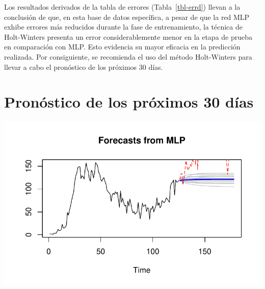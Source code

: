 \documentclass[
  letterpaper,
  DIV=11,
  numbers=noendperiod]{scrreport}
\newenvironment{Shaded}{\begin{snugshade}}{\end{snugshade}}
\newcommand{\AttributeTok}[1]{\textcolor[rgb]{0.40,0.45,0.13}{#1}}
\newcommand{\CommentTok}[1]{\textcolor[rgb]{0.37,0.37,0.37}{#1}}
\newcommand{\DecValTok}[1]{\textcolor[rgb]{0.68,0.00,0.00}{#1}}
\newcommand{\FunctionTok}[1]{\textcolor[rgb]{0.28,0.35,0.67}{#1}}
\newcommand{\NormalTok}[1]{\textcolor[rgb]{0.00,0.23,0.31}{#1}}
\newcommand{\OtherTok}[1]{\textcolor[rgb]{0.00,0.23,0.31}{#1}}
\newcommand{\SpecialCharTok}[1]{\textcolor[rgb]{0.37,0.37,0.37}{#1}}
\theoremstyle{plain}
\theoremstyle{definition}
\theoremstyle{definition}
\theoremstyle{plain}
\theoremstyle{remark}
\begin{document}
Los resultados derivados de la tabla de errores (Tabla~\ref{tbl-errd})
llevan a la conclusión de que, en esta base de datos específica, a pesar
de que la red MLP exhibe errores más reducidos durante la fase de
entrenamiento, la técnica de Holt-Winters presenta un error
considerablemente menor en la etapa de prueba en comparación con MLP.
Esto evidencia su mayor eficacia en la predicción realizada. Por
consiguiente, se recomienda el uso del método Holt-Winters para llevar a
cabo el pronóstico de los próximos 30 días.

\section{Pronóstico de los próximos 30
días}\label{pronuxf3stico-de-los-pruxf3ximos-30-duxedas-1}

\begin{Shaded}
\end{Shaded}

\includegraphics{muertes_files/figure-pdf/unnamed-chunk-10-1.pdf}
\end{document}

